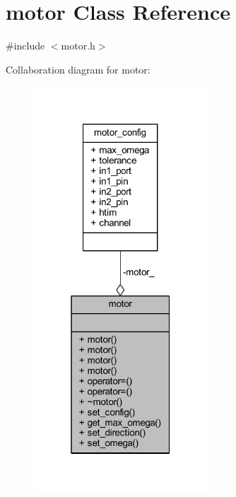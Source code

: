 \hypertarget{classmotor}{}\section{motor Class Reference}
\label{classmotor}


{\ttfamily \#include $<$motor.\+h$>$}



Collaboration diagram for motor\+:
\nopagebreak
\begin{figure}[H]
\begin{center}
\leavevmode
\includegraphics[width=184pt]{classmotor__coll__graph}
\end{center}
\end{figure}
